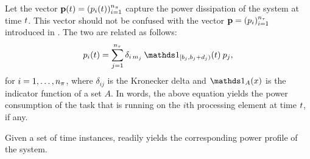 Let the vector $\mathbf{p}(t) = (p_i(t))_{i = 1}^{{n_\pi}}$ capture the power dissipation
of the system at time $t$. This vector should not be confused with the vector
$\mathbf{p} = (p_i)_{i = 1}^{{n_\tau}}$ introduced in . The two
are related as follows:
\begin{equation} \elab{power}
  p_i(\t) = \sum_{j = 1}^{\nt} \delta_{i\,m_j} \: \one_{[\b_j, \b_j + \d_j)}(\t) \: p_j,
\end{equation}
for $i = 1, \dots, {n_\pi}$, where $\delta_{ij}$ is the Kronecker delta and
$\one_A(x)$ is the indicator function of a set $A$. In words, the above equation
yields the power consumption of the task that is running on the $i$th processing
element at time $t$, if any.

Given a set of time instances,  readily yields the corresponding
power profile of the system.
